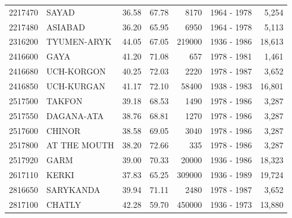 \begin{longtable}{lp{4.3cm}llrlr}
2217470 & SAYAD & 36.58 & 67.78 & 8170 & 1964 - 1978 & 5,254 \\
2217480 & ASIABAD & 36.20 & 65.95 & 6950 & 1964 - 1978 & 5,113 \\
2316200 & TYUMEN-ARYK & 44.05 & 67.05 & 219000 & 1936 - 1986 & 18,613 \\
2416600 & GAYA & 41.20 & 71.08 & 657 & 1978 - 1981 & 1,461 \\
2416680 & UCH-KORGON & 40.25 & 72.03 & 2220 & 1978 - 1987 & 3,652 \\
2416850 & UCH-KURGAN & 41.17 & 72.10 & 58400 & 1938 - 1983 & 16,801 \\
2517500 & TAKFON & 39.18 & 68.53 & 1490 & 1978 - 1986 & 3,287 \\
2517550 & DAGANA-ATA & 38.76 & 68.81 & 1270 & 1978 - 1986 & 3,287 \\
2517600 & CHINOR & 38.58 & 69.05 & 3040 & 1978 - 1986 & 3,287 \\
2517800 & AT THE MOUTH & 38.20 & 72.66 & 335 & 1978 - 1986 & 3,287 \\
2517920 & GARM & 39.00 & 70.33 & 20000 & 1936 - 1986 & 18,323 \\
2617110 & KERKI & 37.83 & 65.25 & 309000 & 1936 - 1989 & 19,724 \\
2816650 & SARYKANDA & 39.94 & 71.11 & 2480 & 1978 - 1987 & 3,652 \\
2817100 & CHATLY & 42.28 & 59.70 & 450000 & 1936 - 1973 & 13,880 \\
\end{longtable}
